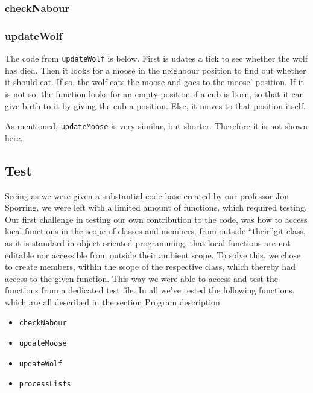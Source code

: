 \documentclass[a4paper]{report}
\begin{document}


\subsubsection*{checkNabour}

\subsubsection*{updateWolf}


The code from \texttt{updateWolf} is below. First is udates a tick to see whether the wolf has died. Then it looks for a moose in the neighbour position to find out whether it should eat. If so, the wolf eats the moose and goes to the moose' position. If it is not so, the function looks for an empty position if a cub is born, so that it can give birth to it by giving the cub a position. Else, it moves to that position itself. 

As mentioned, \texttt{updateMoose} is very similar, but shorter. Therefore it is not shown here.




\subsection*{Test}

Seeing as we were given a substantial code base created by our professor Jon Sporring, we were left with a limited amount of functions, which required testing.
Our first challenge in testing our own contribution to the code, was how to access local functions in the scope of classes and members, from outside “their”git  class, as it is standard in object oriented programming, that local functions are not editable nor accessible from outside their ambient scope.
To solve this, we chose to create members, within the scope of the respective class, which thereby had access to the given function. This way we were able to access and test the functions from a dedicated test file.
In all we’ve tested the following functions, which are all described in the section Program description:
\begin{itemize}
\item \texttt{checkNabour}
\item \texttt{updateMoose}
\item \texttt{updateWolf}
\item \texttt{processLists}
\end{itemize}
\end{document}

